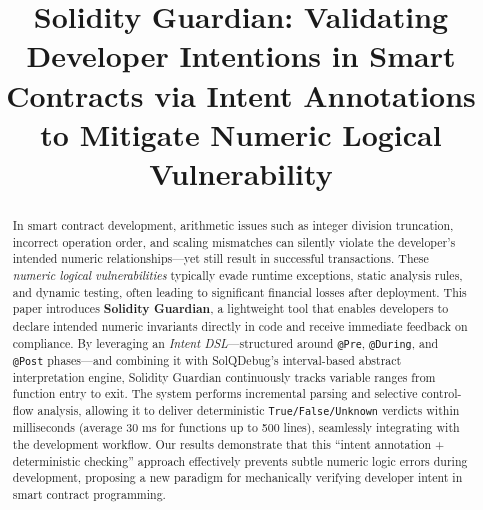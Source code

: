 \documentclass[10pt, conference]{IEEEtran}
\begin{document}
\title{Solidity Guardian: Validating Developer Intentions in Smart Contracts via Intent Annotations to Mitigate Numeric Logical Vulnerability}

\newif\ifblind        %
\blindtrue            %

  \author{%
    \and
    \and
    \and
    }


\maketitle

\begin{abstract}
In smart contract development, arithmetic issues such as integer division truncation, incorrect operation order, and scaling mismatches can silently violate the developer's intended numeric relationships—yet still result in successful transactions. These \textit{numeric logical vulnerabilities} typically evade runtime exceptions, static analysis rules, and dynamic testing, often leading to significant financial losses after deployment. This paper introduces \textbf{Solidity Guardian}, a lightweight tool that enables developers to declare intended numeric invariants directly in code and receive immediate feedback on compliance. By leveraging an \textit{Intent DSL}—structured around \texttt{@Pre}, \texttt{@During}, and \texttt{@Post} phases—and combining it with SolQDebug's interval-based abstract interpretation engine, Solidity Guardian continuously tracks variable ranges from function entry to exit. The system performs incremental parsing and selective control-flow analysis, allowing it to deliver deterministic \texttt{True/False/Unknown} verdicts within milliseconds (average 30 ms for functions up to 500 lines), seamlessly integrating with the development workflow. Our results demonstrate that this “intent annotation + deterministic checking” approach effectively prevents subtle numeric logic errors during development, proposing a new paradigm for mechanically verifying developer intent in smart contract programming.
\end{abstract}
\end{document}
